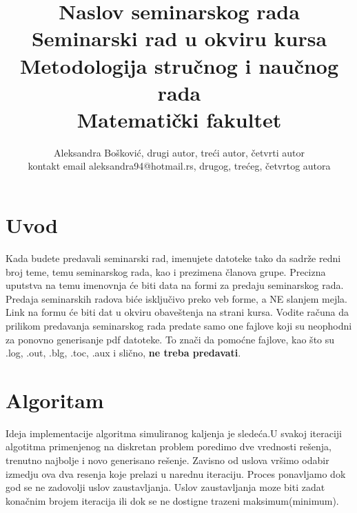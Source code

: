 \documentclass[a4paper]{article}
\begin{document}
\title{Naslov seminarskog rada\\ \small{Seminarski rad u okviru kursa\\Metodologija stručnog i naučnog rada\\ Matematički fakultet}}

\author{Aleksandra Bošković, drugi autor, treći autor, četvrti autor\\ kontakt email aleksandra94@hotmail.rs, drugog, trećeg, četvrtog autora}


\maketitle


\tableofcontents

\newpage

\section{Uvod}
\label{sec:uvod}

Kada budete predavali seminarski rad, imenujete datoteke tako da sadrže redni broj teme, temu seminarskog rada, kao i prezimena članova grupe. Precizna uputstva na temu imenovnja će biti data na formi za predaju seminarskog rada. Predaja seminarskih radova biće isključivo preko veb forme, a NE slanjem mejla. Link na formu će biti dat u okviru obaveštenja na strani kursa. Vodite računa da prilikom predavanja seminarskog rada predate samo one fajlove koji su neophodni za ponovno generisanje pdf datoteke. To znači da pomoćne fajlove, kao što su .log, .out, .blg, .toc, .aux i slično, \textbf{ne treba predavati}.


\section{Algoritam}
Ideja implementacije algoritma simuliranog kaljenja je sledeća.U svakoj iteraciji algotitma primenjenog na diskretan problem poredimo dve vrednosti rešenja, trenutno najbolje i novo generisano rešenje. Zavisno od uslova vršimo odabir izmedju ova dva resenja koje prelazi u narednu iteraciju. Proces ponavljamo  dok god se ne zadovolji uslov zaustavljanja. Uslov zaustavljanja moze biti zadat konačnim brojem iteracija ili dok se ne dostigne trazeni maksimum(minimum).
\end{document}
